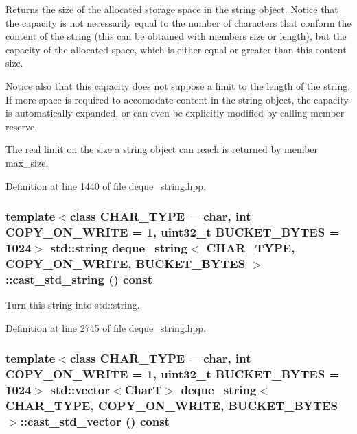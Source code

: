 Returns the size of the allocated storage space in the string object. Notice that the capacity is not necessarily equal to the number of characters that conform the content of the string (this can be obtained with members size or length), but the capacity of the allocated space, which is either equal or greater than this content size.

Notice also that this capacity does not suppose a limit to the length of the string. If more space is required to accomodate content in the string object, the capacity is automatically expanded, or can even be explicitly modified by calling member reserve.

The real limit on the size a string object can reach is returned by member max\_\-size. 

Definition at line 1440 of file deque\_\-string.hpp.\hypertarget{classdeque__string_cf24d0ac8c5ec359d3a5732efdd0b98b}{
\subsubsection[{cast\_\-std\_\-string}]{\setlength{\rightskip}{0pt plus 5cm}template$<$class CHAR\_\-TYPE  = char, int COPY\_\-ON\_\-WRITE = 1, uint32\_\-t BUCKET\_\-BYTES = 1024$>$ std::string {\bf deque\_\-string}$<$ CHAR\_\-TYPE, COPY\_\-ON\_\-WRITE, BUCKET\_\-BYTES $>$::cast\_\-std\_\-string () const}}
\label{classdeque__string_cf24d0ac8c5ec359d3a5732efdd0b98b}


Turn this string into std::string. 

Definition at line 2745 of file deque\_\-string.hpp.\hypertarget{classdeque__string_bdea4c4f98fb0c2f65a138cdef8d0331}{
\subsubsection[{cast\_\-std\_\-vector}]{\setlength{\rightskip}{0pt plus 5cm}template$<$class CHAR\_\-TYPE  = char, int COPY\_\-ON\_\-WRITE = 1, uint32\_\-t BUCKET\_\-BYTES = 1024$>$ std::vector$<$CharT$>$ {\bf deque\_\-string}$<$ CHAR\_\-TYPE, COPY\_\-ON\_\-WRITE, BUCKET\_\-BYTES $>$::cast\_\-std\_\-vector () const}}
\label{classdeque__string_bdea4c4f98fb0c2f65a138cdef8d0331}


